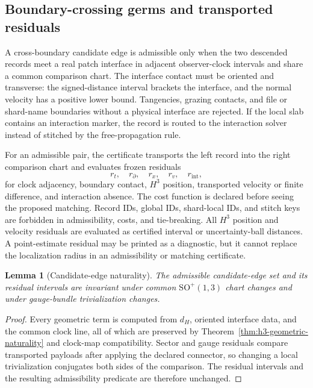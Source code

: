 \documentclass[11pt]{article}
\newtheorem{lemma}[theorem]{Lemma}
\begin{document}
\subsection{Boundary-crossing germs and transported residuals}

A cross-boundary candidate edge is admissible only when the two descended records meet a real
patch interface in adjacent observer-clock intervals and share a common comparison chart. The
interface contact must be oriented and transverse: the signed-distance interval brackets the
interface, and the normal velocity has a positive lower bound. Tangencies, grazing contacts, and
file or shard-name boundaries without a physical interface are rejected. If the local slab contains
an interaction marker, the record is routed to the interaction solver instead of stitched by the
free-propagation rule.

For an admissible pair, the certificate transports the left record into the right comparison chart
and evaluates frozen residuals
\[
r_t,\quad r_{\partial},\quad r_x,\quad r_v,\quad r_{\mathrm{int}},
\]
for clock adjacency, boundary contact, \(H^3\) position, transported velocity or finite
difference, and interaction absence. The cost function is declared before seeing the proposed
matching. Record IDs, global IDs, shard-local IDs, and stitch keys are forbidden in admissibility,
costs, and tie-breaking.
All \(H^3\) position and velocity residuals are evaluated as certified interval or
uncertainty-ball distances. A point-estimate residual may be printed as a diagnostic, but it cannot
replace the localization radius in an admissibility or matching certificate.

\begin{lemma}[Candidate-edge naturality]\label{lem:h3-candidate-edge-naturality}
The admissible candidate-edge set and its residual intervals are invariant under common
\(\mathrm{SO}^{+}(1,3)\) chart changes and under gauge-bundle trivialization changes.
\end{lemma}

\begin{proof}
Every geometric term is computed from \(d_H\), oriented interface data, and the common clock line,
all of which are preserved by Theorem~\ref{thm:h3-geometric-naturality} and clock-map
compatibility. Sector and gauge residuals compare transported payloads after applying the declared
connector, so changing a local trivialization conjugates both sides of the comparison. The
residual intervals and the resulting admissibility predicate are therefore unchanged.
\end{proof}
\end{document}
